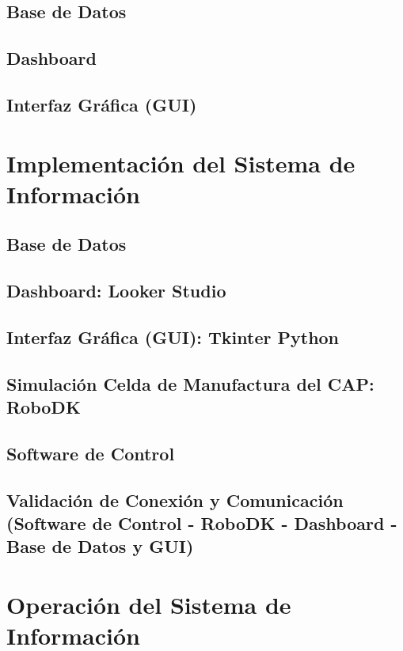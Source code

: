 \documentclass{thesis-tg-ie-pujc} %
\begin{document}
\section{Base de Datos}

\section{Dashboard}

\section{Interfaz Gráfica (GUI)}


\chapter{Implementación del Sistema de Información}

\section{Base de Datos}

\section{Dashboard: Looker Studio}

\newpage
\section{Interfaz Gráfica (GUI): Tkinter Python}

\section{Simulación Celda de Manufactura del CAP: RoboDK}

\newpage
\section{Software de Control}


\section{Validación de Conexión y Comunicación (Software de Control - RoboDK - Dashboard - Base de Datos y GUI)}


\chapter{Operación del Sistema de Información}
\end{document}
